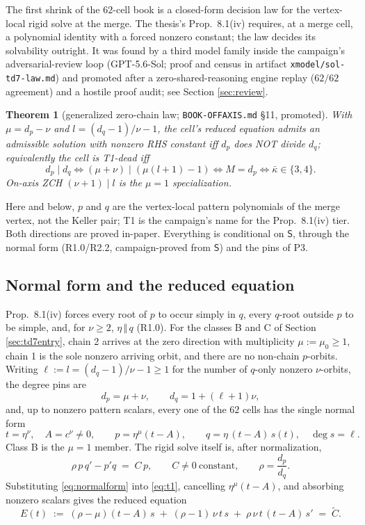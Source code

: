 \documentclass[11pt]{article}
\newtheorem{theorem}{Theorem}[section]
\theoremstyle{definition}
\theoremstyle{remark}
\newcommand{\kb}{\bar\kappa}
\begin{document}
The first shrink of the $62$-cell book is a closed-form decision law for the vertex-local rigid solve at the merge. The thesis's Prop.~8.1(iv) requires, at a merge cell, a polynomial identity with a forced nonzero constant; the law decides its solvability outright. It was found by a third model family inside the campaign's adversarial-review loop (GPT-5.6-Sol; proof and census in artifact \texttt{xmodel/sol-td7-law.md}) and promoted after a zero-shared-reasoning engine replay ($62/62$ agreement) and a hostile proof audit; see Section \ref{sec:review}.

\begin{theorem}[generalized zero-chain law; \texttt{BOOK-OFFAXIS.md} \S11, promoted]\label{thm:zcl}
With $\mu=d_p-\nu$ and $l=(d_q-1)/\nu-1$, the cell's reduced equation admits an admissible solution with nonzero RHS constant iff $d_p$ does NOT divide $d_q$; equivalently the cell is T1-dead iff
\[
d_p\mid d_q\iff(\mu+\nu)\mid(\mu(l+1)-1)\iff M=d_p\iff \kb\in\{3,4\}.
\]
On-axis ZCH $(\nu+1)\mid l$ is the $\mu=1$ specialization.
\end{theorem}

Here and below, $p$ and $q$ are the vertex-local pattern polynomials of the merge vertex, not the Keller pair; T1 is the campaign's name for the Prop.~8.1(iv) tier. Both directions are proved in-paper. Everything is conditional on $\mathsf{S}$, through the normal form (R1.0/R2.2, campaign-proved from $\mathsf{S}$) and the pins of P3.

\subsection{Normal form and the reduced equation}

Prop.~8.1(iv) forces every root of $p$ to occur simply in $q$, every $q$-root outside $p$ to be simple, and, for $\nu\geq 2$, $\eta\,\Vert\,q$ (R1.0). For the classes B and C of Section \ref{sec:td7entry}, chain 2 arrives at the zero direction with multiplicity $\mu:=\mu_0\geq1$, chain 1 is the sole nonzero arriving orbit, and there are no non-chain $p$-orbits. Writing $\ell:=l=(d_q-1)/\nu-1\geq1$ for the number of $q$-only nonzero $\nu$-orbits, the degree pins are
\[
d_p=\mu+\nu,\qquad d_q=1+(\ell+1)\nu,
\]
and, up to nonzero pattern scalars, every one of the $62$ cells has the single normal form
\begin{equation}\label{eq:normalform}
t=\eta^{\nu},\quad A=c^{\nu}\neq0,\qquad p=\eta^{\mu}(t-A),\qquad q=\eta\,(t-A)\,s(t),\quad \deg s=\ell.
\end{equation}
Class B is the $\mu=1$ member. The rigid solve itself is, after normalization,
\begin{equation}\label{eq:t1}
\rho\,p\,q'-p'q\;=\;C\,p,\qquad C\neq0\ \text{constant},\qquad \rho=\frac{d_p}{d_q}.
\end{equation}
Substituting \eqref{eq:normalform} into \eqref{eq:t1}, cancelling $\eta^{\mu}(t-A)$, and absorbing nonzero scalars gives the reduced equation
\begin{equation}\label{eq:reduced}
E(t)\;:=\;(\rho-\mu)(t-A)\,s\;+\;(\rho-1)\,\nu\,t\,s\;+\;\rho\,\nu\,t\,(t-A)\,s'\;=\;\widetilde C .
\end{equation}
\end{document}
